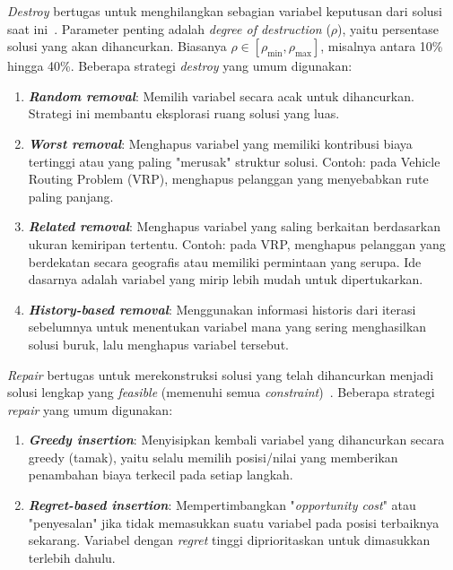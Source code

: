 \documentclass{file/TA-ITS}
\theoremstyle{definition}
\theoremstyle{definition}
\theoremstyle{plain}
\begin{document}
\textit{Destroy} bertugas untuk menghilangkan sebagian variabel keputusan dari solusi saat ini~\cite{pisinger2018lns}. Parameter penting adalah \textit{degree of destruction} ($\rho$), yaitu persentase solusi yang akan dihancurkan. Biasanya $\rho \in [\rho_{\min}, \rho_{\max}]$, misalnya antara 10\% hingga 40\%. Beberapa strategi \textit{destroy} yang umum digunakan:

\begin{enumerate}
    \item \textbf{\textit{Random removal}}: Memilih variabel secara acak untuk dihancurkan. Strategi ini membantu eksplorasi ruang solusi yang luas.
    
    \item \textbf{\textit{Worst removal}}: Menghapus variabel yang memiliki kontribusi biaya tertinggi atau yang paling "merusak" struktur solusi. Contoh: pada Vehicle Routing Problem (VRP), menghapus pelanggan yang menyebabkan rute paling panjang.
    
    \item \textbf{\textit{Related removal}}: Menghapus variabel yang saling berkaitan berdasarkan ukuran kemiripan tertentu. Contoh: pada VRP, menghapus pelanggan yang berdekatan secara geografis atau memiliki permintaan yang serupa. Ide dasarnya adalah variabel yang mirip lebih mudah untuk dipertukarkan.
    
    \item \textbf{\textit{History-based removal}}: Menggunakan informasi historis dari iterasi sebelumnya untuk menentukan variabel mana yang sering menghasilkan solusi buruk, lalu menghapus variabel tersebut.
\end{enumerate}

\textit{Repair} bertugas untuk merekonstruksi solusi yang telah dihancurkan menjadi solusi lengkap yang \textit{feasible} (memenuhi semua \textit{constraint})~\cite{pisinger2018lns}. Beberapa strategi \textit{repair} yang umum digunakan:

\begin{enumerate}
    \item \textit{\textbf{Greedy insertion}}: Menyisipkan kembali variabel yang dihancurkan secara greedy (tamak), yaitu selalu memilih posisi/nilai yang memberikan penambahan biaya terkecil pada setiap langkah.
    
    \item \textit{\textbf{Regret-based insertion}}: Mempertimbangkan "\textit{opportunity cost}" atau "penyesalan" jika tidak memasukkan suatu variabel pada posisi terbaiknya sekarang. Variabel dengan \textit{regret} tinggi diprioritaskan untuk dimasukkan terlebih dahulu.
\end{enumerate}
\end{document}

